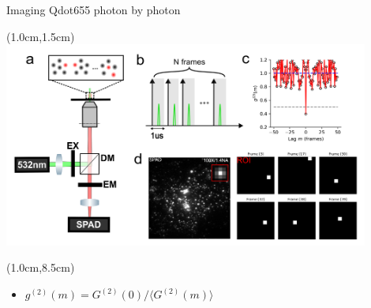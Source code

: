 \documentclass{beamer}					%
\begin{document}


\begin{frame}{Imaging Qdot655 photon by photon}
\begin{textblock*}{12cm}(1.0cm,1.5cm)
\includegraphics[width=12cm]{../../spad/spad/media/Figure-0.png}
\end{textblock*}
\begin{textblock*}{13cm}(1.0cm,8.5cm)
\begin{itemize}
\item $g^{(2)}(m) = G^{(2)}(0)/\langle G^{(2)}(m)\rangle$
\end{itemize}
\end{textblock*}

\end{frame}
\end{document}
